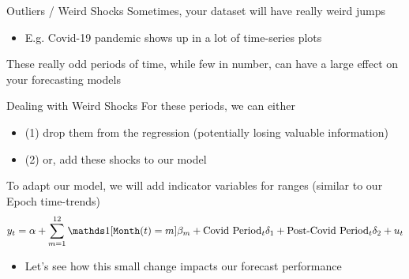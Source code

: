 \documentclass[aspectratio=169,t,11pt,table]{beamer}
\begin{document}




\begin{frame}{Outliers / Weird Shocks}
  Sometimes, your dataset will have really weird jumps
  \begin{itemize}
    \item E.g. Covid-19 pandemic shows up in a lot of time-series plots
  \end{itemize}

  \bigskip
  These really odd periods of time, while few in number, can have a large effect on your forecasting models
\end{frame}


\begin{frame}{Dealing with Weird Shocks}
  For these periods, we can either
  \begin{itemize}
    \item (1) drop them from the regression (potentially losing valuable information)
    
    \item (2) or, add these shocks to our model
  \end{itemize}

  \pause
  \bigskip
  To adapt our model, we will add indicator variables for ranges (similar to our Epoch time-trends)
  $$
    y_t = \alpha + \sum_{m = 1}^{12} \one{\texttt{Month}(t) = m} \beta_m + \text{Covid Period}_t \delta_1 + \text{Post-Covid Period}_t \delta_2 + u_t
  $$
  
  \begin{itemize}
    \item Let's see how this small change impacts our forecast performance
  \end{itemize}
\end{frame}
\end{document}
